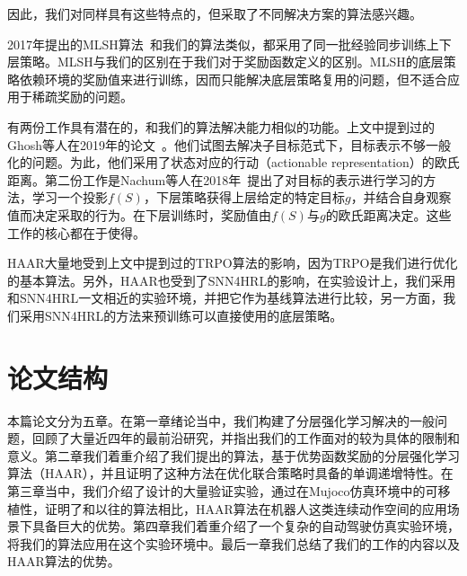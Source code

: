 因此，我们对同样具有这些特点的，但采取了不同解决方案的算法感兴趣。

2017年提出的MLSH算法~\cite{MLSH}和我们的算法类似，都采用了同一批经验同步训练上下层策略。MLSH与我们的区别在于我们对于奖励函数定义的区别。MLSH的底层策略依赖环境的奖励值来进行训练，因而只能解决底层策略复用的问题，但不适合应用于稀疏奖励的问题。

有两份工作具有潜在的，和我们的算法解决能力相似的功能。上文中提到过的Ghosh等人在2019年的论文~\cite{goal-conditioned}。他们试图去解决子目标范式下，目标表示不够一般化的问题。为此，他们采用了状态对应的行动（actionable representation）的欧氏距离。第二份工作是Nachum等人在2018年~\cite{goal_repr_learning}提出了对目标的表示进行学习的方法，学习一个投影$f(S)$，下层策略获得上层给定的特定目标$g$，并结合自身观察值而决定采取的行为。在下层训练时，奖励值由$f(S)$与$g$的欧氏距离决定。这些工作的核心都在于使得。

HAAR大量地受到上文中提到过的TRPO算法的影响，因为TRPO是我们进行优化的基本算法。另外，HAAR也受到了SNN4HRL的影响，在实验设计上，我们采用和SNN4HRL一文相近的实验环境，并把它作为基线算法进行比较，另一方面，我们采用SNN4HRL的方法来预训练可以直接使用的底层策略。

\section{论文结构}
本篇论文分为五章。在第一章绪论当中，我们构建了分层强化学习解决的一般问题，回顾了大量近四年的最前沿研究，并指出我们的工作面对的较为具体的限制和意义。第二章我们着重介绍了我们提出的算法，基于优势函数奖励的分层强化学习算法（HAAR），并且证明了这种方法在优化联合策略时具备的单调递增特性。在第三章当中，我们介绍了设计的大量验证实验，通过在Mujoco仿真环境中的可移植性，证明了和以往的算法相比，HAAR算法在机器人这类连续动作空间的应用场景下具备巨大的优势。第四章我们着重介绍了一个复杂的自动驾驶仿真实验环境，将我们的算法应用在这个实验环境中。最后一章我们总结了我们的工作的内容以及HAAR算法的优势。